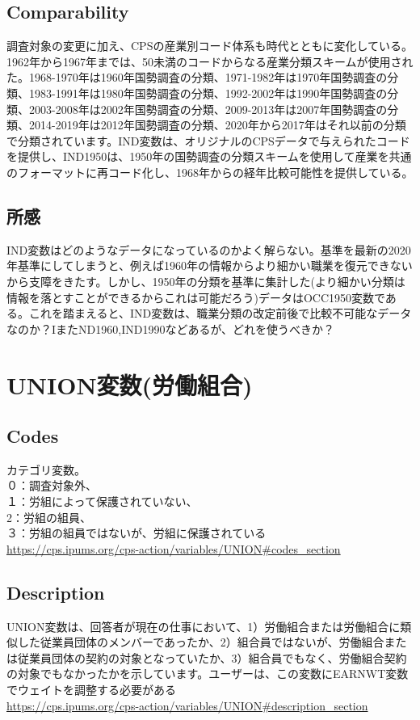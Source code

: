 \documentclass{jsarticle}
\begin{document}
\subsection{Comparability}
調査対象の変更に加え、CPSの産業別コード体系も時代とともに変化している。1962年から1967年までは、50未満のコードからなる産業分類スキームが使用された。1968-1970年は1960年国勢調査の分類、1971-1982年は1970年国勢調査の分類、1983-1991年は1980年国勢調査の分類、1992-2002年は1990年国勢調査の分類、2003-2008年は2002年国勢調査の分類、2009-2013年は2007年国勢調査の分類、2014-2019年は2012年国勢調査の分類、2020年から2017年はそれ以前の分類で分類されています。IND変数は、オリジナルのCPSデータで与えられたコードを提供し、IND1950は、1950年の国勢調査の分類スキームを使用して産業を共通のフォーマットに再コード化し、1968年からの経年比較可能性を提供している。

\subsection{所感}
IND変数はどのようなデータになっているのかよく解らない。基準を最新の2020年基準にしてしまうと、例えば1960年の情報からより細かい職業を復元できないから支障をきたす。しかし、1950年の分類を基準に集計した(より細かい分類は情報を落とすことができるからこれは可能だろう)データはOCC1950変数である。これを踏まえると、IND変数は、職業分類の改定前後で比較不可能なデータなのか？IまたND1960,IND1990などあるが、どれを使うべきか？

\section{UNION変数(労働組合)}

\subsection{Codes}
カテゴリ変数。\\
０：調査対象外、\\
１：労組によって保護されていない、\\
2：労組の組員、\\
３：労組の組員ではないが、労組に保護されている\\
\url{https://cps.ipums.org/cps-action/variables/UNION#codes_section}

\subsection{Description}
UNION変数は、回答者が現在の仕事において、1）労働組合または労働組合に類似した従業員団体のメンバーであったか、2）組合員ではないが、労働組合または従業員団体の契約の対象となっていたか、3）組合員でもなく、労働組合契約の対象でもなかったかを示しています。ユーザーは、この変数にEARNWT変数でウェイトを調整する必要がある\\
\url{https://cps.ipums.org/cps-action/variables/UNION#description_section}
\end{document}
